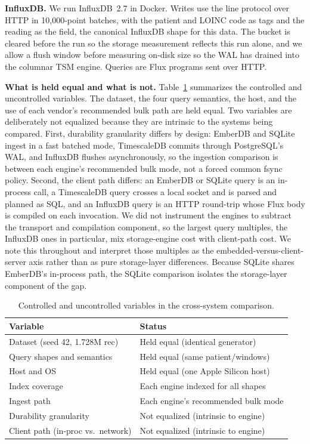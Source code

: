\documentclass[journal]{IEEEtran}
\begin{document}
\textbf{InfluxDB.} We run InfluxDB~2.7 in Docker. Writes use the line protocol over HTTP in 10{,}000-point batches, with the patient and LOINC code as tags and the reading as the field, the canonical InfluxDB shape for this data. The bucket is cleared before the run so the storage measurement reflects this run alone, and we allow a flush window before measuring on-disk size so the WAL has drained into the columnar TSM engine. Queries are Flux programs sent over HTTP.

\textbf{What is held equal and what is not.} Table~\ref{tab:controlled} summarizes the controlled and uncontrolled variables. The dataset, the four query semantics, the host, and the use of each vendor's recommended bulk path are held equal. Two variables are deliberately not equalized because they are intrinsic to the systems being compared. First, durability granularity differs by design: EmberDB and SQLite ingest in a fast batched mode, TimescaleDB commits through PostgreSQL's WAL, and InfluxDB flushes asynchronously, so the ingestion comparison is between each engine's recommended bulk mode, not a forced common fsync policy. Second, the client path differs: an EmberDB or SQLite query is an in-process call, a TimescaleDB query crosses a local socket and is parsed and planned as SQL, and an InfluxDB query is an HTTP round-trip whose Flux body is compiled on each invocation. We did not instrument the engines to subtract the transport and compilation component, so the largest query multiples, the InfluxDB ones in particular, mix storage-engine cost with client-path cost. We note this throughout and interpret those multiples as the embedded-versus-client-server axis rather than as pure storage-layer differences. Because SQLite shares EmberDB's in-process path, the SQLite comparison isolates the storage-layer component of the gap.

\begin{table}[htbp]
\centering
\caption{Controlled and uncontrolled variables in the cross-system comparison.}
\label{tab:controlled}
\setlength{\tabcolsep}{4pt}
\begin{tabular}{ll}
\toprule
\textbf{Variable} & \textbf{Status} \\
\midrule
Dataset (seed 42, 1.728M rec) & Held equal (identical generator) \\
Query shapes and semantics & Held equal (same patient/windows) \\
Host and OS & Held equal (one Apple Silicon host) \\
Index coverage & Each engine indexed for all shapes \\
Ingest path & Each engine's recommended bulk mode \\
Durability granularity & Not equalized (intrinsic to engine) \\
Client path (in-proc vs.\ network) & Not equalized (intrinsic to engine) \\
\bottomrule
\end{tabular}
\end{table}
\end{document}
